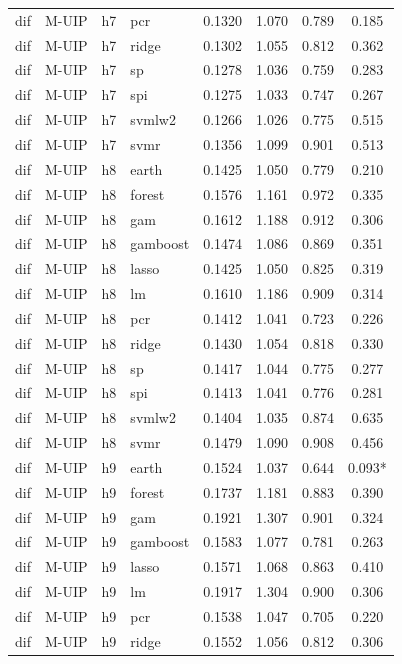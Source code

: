 \begin{ThreePartTable}
\begin{longtable}[t]{llclcccc}
dif & M-UIP & h7 & pcr & 0.1320 & 1.070 & 0.789 & 0.185\\
dif & M-UIP & h7 & ridge & 0.1302 & 1.055 & 0.812 & 0.362\\
dif & M-UIP & h7 & sp & 0.1278 & 1.036 & 0.759 & 0.283\\
dif & M-UIP & h7 & spi & 0.1275 & 1.033 & 0.747 & 0.267\\
dif & M-UIP & h7 & svmlw2 & 0.1266 & 1.026 & 0.775 & 0.515\\
dif & M-UIP & h7 & svmr & 0.1356 & 1.099 & 0.901 & 0.513\\
\addlinespace
dif & M-UIP & h8 & earth & 0.1425 & 1.050 & 0.779 & 0.210\\
dif & M-UIP & h8 & forest & 0.1576 & 1.161 & 0.972 & 0.335\\
dif & M-UIP & h8 & gam & 0.1612 & 1.188 & 0.912 & 0.306\\
dif & M-UIP & h8 & gamboost & 0.1474 & 1.086 & 0.869 & 0.351\\
dif & M-UIP & h8 & lasso & 0.1425 & 1.050 & 0.825 & 0.319\\
dif & M-UIP & h8 & lm & 0.1610 & 1.186 & 0.909 & 0.314\\
dif & M-UIP & h8 & pcr & 0.1412 & 1.041 & 0.723 & 0.226\\
dif & M-UIP & h8 & ridge & 0.1430 & 1.054 & 0.818 & 0.330\\
dif & M-UIP & h8 & sp & 0.1417 & 1.044 & 0.775 & 0.277\\
dif & M-UIP & h8 & spi & 0.1413 & 1.041 & 0.776 & 0.281\\
dif & M-UIP & h8 & svmlw2 & 0.1404 & 1.035 & 0.874 & 0.635\\
dif & M-UIP & h8 & svmr & 0.1479 & 1.090 & 0.908 & 0.456\\
\addlinespace
dif & M-UIP & h9 & earth & 0.1524 & 1.037 & 0.644 & 0.093*\\
dif & M-UIP & h9 & forest & 0.1737 & 1.181 & 0.883 & 0.390\\
dif & M-UIP & h9 & gam & 0.1921 & 1.307 & 0.901 & 0.324\\
dif & M-UIP & h9 & gamboost & 0.1583 & 1.077 & 0.781 & 0.263\\
dif & M-UIP & h9 & lasso & 0.1571 & 1.068 & 0.863 & 0.410\\
dif & M-UIP & h9 & lm & 0.1917 & 1.304 & 0.900 & 0.306\\
dif & M-UIP & h9 & pcr & 0.1538 & 1.047 & 0.705 & 0.220\\
dif & M-UIP & h9 & ridge & 0.1552 & 1.056 & 0.812 & 0.306\\

\end{longtable}
\end{ThreePartTable}
